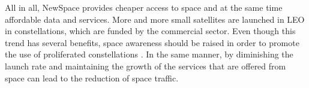 
All in all, NewSpace provides cheaper access to space and at the same time affordable data and services. More and more small satellites are launched in LEO in constellations, which are funded by the commercial sector. Even though this trend has several benefits, space awareness should be raised in order to promote the use of proliferated constellations \cite{pLEO}. In the same manner, by diminishing the launch rate and maintaining the growth of the services that are offered from space can lead to the reduction of space traffic. %


